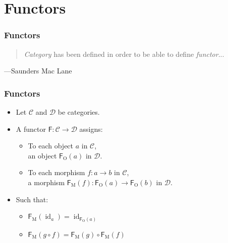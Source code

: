 \documentclass{beamer}
\DeclareMathOperator{\obj}{O}
\DeclareMathOperator{\mor}{M}
\DeclareMathOperator{\id}{id}
\newcommand{\idO}[1]{\natO{\id}{#1}}
\newcommand{\comp}{\ensuremath{\mathrel{\circ}}}
\newcommand{\cat}[1]{\ensuremath{\mathcal{#1}}}
\newcommand{\func}[1]{\ensuremath{\mathsf{#1}}}
\newcommand{\funcO}[1]{\ensuremath{\func{#1}_{\obj}}}
\newcommand{\funcM}[1]{\ensuremath{\func{#1}_{\mor}}}
\newcommand{\nat}[1]{\ensuremath{#1}}
\newcommand{\natO}[2]{\ensuremath{\nat{#1}_{#2}}}
\begin{document}
\section{Functors}


\begin{frame}
  \frametitle{Functors}

  \begin{quote}
    \emph{Category} has been defined in order to be able to define
    \emph{functor}...
  \end{quote}
  \hfill ---Saunders Mac Lane

\end{frame}


\begin{frame}[label={def:functor}]
  \frametitle{Functors}

  \begin{definition}[Functor]
    \begin{itemize}
    \item
      Let \cat{C} and \cat{D} be categories.
    \item
      A functor $\func{F}: \cat{C} \to \cat{D}$ assigns:
      \begin{itemize}
      \item
        To each object $a$ in \cat{C},\\ an object $\funcO{F}(a)$ in
        \cat{D}.
      \item
        To each morphism $f: a \to b$ in \cat{C},\\ a morphism
        $\funcM{F}(f): \funcO{F}(a) \to \funcO{F}(b)$ in \cat{D}.
      \end{itemize}
    \item
      Such that:
      \begin{itemize}
      \item
        $\funcM{F}(\idO{a}) = \idO{\funcO{F}(a)}$
      \item
        $\funcM{F}(g \comp f) = \funcM{F}(g) \comp \funcM{F}(f)$
      \end{itemize}
    \end{itemize}
  \end{definition}

\end{frame}

\end{document}
